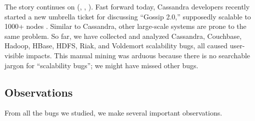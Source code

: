 %
%

The story continues on (, , \etc).  Fast forward today,
Cassandra developers recently started a new umbrella ticket for discussing
``Gossip 2.0,''  supposedly scalable to 1000+
nodes \cite{Gossip20, Gossip20Mail}.
Similar to Cassandra, other large-scale systems are prone to the same
problem.  So far, we have collected and analyzed \totCass Cassandra, \totCouch
Couchbase, \totHadoop Hadoop, \totHBase HBase, \totHDFS HDFS, \totRiak
Riak, and \totVold Voldemort scalability bugs, all caused user-visible
impacts.
%
This manual mining was arduous because there is no searchable jargon for
``scalability bugs''; we might have missed other bugs.
%

\subsection{Observations}
\label{mot-observe}

From all the bugs we studied, we make several important observations.

